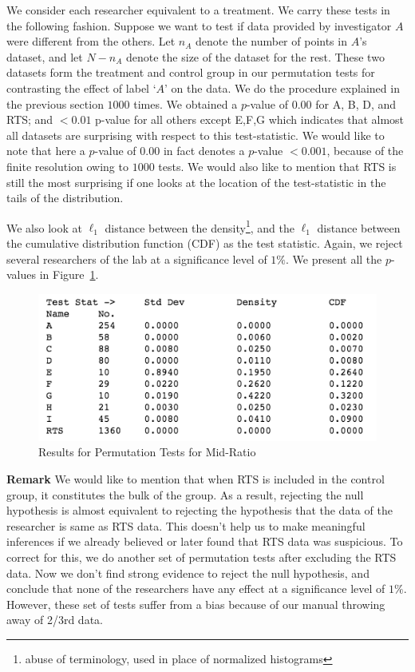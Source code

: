 \documentclass{article}
\begin{document}
We consider each researcher equivalent to a treatment. We carry these tests in the following fashion. Suppose we want to test if data provided by investigator $A$ were different from the others. Let $n_A$ denote the number of points in $A$'s dataset, and let $N-n_A$ denote the size of the dataset for the rest. These two datasets form the treatment and control group in our permutation tests for contrasting the effect of label `$A$' on the data. We do the procedure explained in the previous section $1000$ times. We obtained a $p$-value of $0.00$ for A, B, D, and RTS; and \(<0.01\) p-value for all others except E,F,G which
indicates that almost all datasets are surprising with respect to this
test-statistic. We would like to note that here a $p$-value of $0.00$ in fact denotes a $p$-value $<0.001$, because of the finite resolution owing to $1000$ tests. We would also like to mention that RTS is still the most surprising if one looks at the location of the test-statistic in the
tails of the distribution.

We also look at \(\ell_1\) distance between the density\footnote{abuse of terminology, used in place of normalized histograms}, and the
\(\ell_1\) distance between the cumulative distribution function (CDF) as the test statistic. Again, we reject several researchers of the lab at a significance level of \(1 \%\). We present all the $p$-values in Figure~\ref{mid_ratio_perm}.

\begin{figure}[H]
\centering
\includegraphics[width=0.8\linewidth]{images/mid_ratio_perm.png}
\caption{Results for Permutation Tests for Mid-Ratio}
\label{mid_ratio_perm}
\end{figure}

{\bf Remark} We would like to mention that when RTS is included in the control group, it constitutes the bulk of the group. As a result, rejecting the null hypothesis is almost equivalent to rejecting the hypothesis that the data of the researcher is same as RTS data. This doesn't help us to make meaningful inferences if we already believed or later found that RTS data was suspicious. To correct for this, we do another set of permutation tests after excluding the RTS data. Now we don't find strong evidence to reject the null hypothesis, and conclude that none of the researchers have any effect at a significance level of $1\%$. However, these set of tests suffer from a bias because of our manual throwing away of 2/3rd data.
\end{document}
